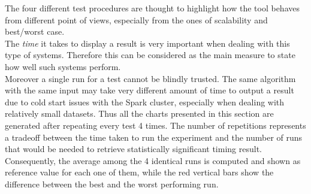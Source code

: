 \documentclass{sig-alternate-05-2015}
\begin{document}
The four different test procedures are thought to highlight how the tool behaves from different point of views, especially from the ones of scalability and best/worst case.\\
The \emph{time} it takes to display a result is very important when dealing with this type of systems. Therefore this can be considered as the main measure to state how well such systems perform.\\
Moreover a single run for a test cannot be blindly trusted. The same algorithm with the same input may take very different amount of time to output a result due to cold start issues with the Spark cluster, especially when dealing with relatively small datasets. Thus all the charts presented in this section are generated after repeating every test 4 times. The number of repetitions represents a tradeoff between the time taken to run the experiment and the number of runs that would be needed to retrieve statistically significant timing result. Consequently, the average among the 4 identical runs is computed and shown as reference value for each one of them, while the red vertical bars show the difference between the best and the worst performing run.\\
\end{document}
